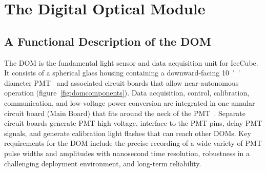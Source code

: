 
\newcommand{\degC}[1]{$\unit[#1]{^\circ{C}}$}
\def\lsim{\mathrel{\rlap{\raise 0.2ex\hbox{$\,<\,$}}{\lower 0.9ex\hbox{$\,\sim\,$}}}}
\def\gsim{\mathrel{\rlap{\raise 0.2ex\hbox{$\,>\,$}}{\lower 0.9ex\hbox{$\,\sim\,$}}}}


\section{\label{sec:dom}The Digital Optical Module}

\subsection{\label{sec:dom_functional}A Functional Description of the DOM}

The DOM is the fundamental light sensor and data acquisition unit for IceCube.
It consists of a spherical glass housing 
containing a downward-facing \SI{10}{''} diameter PMT~\cite{ICECUBE:PMT}
and associated circuit boards that allow near-autonomous operation (figure~\ref{fig:domcomponents}).
Data acquisition, control, calibration, communication, and low-voltage power conversion 
are integrated in one annular circuit board (Main Board) that fits around the neck of the PMT~\cite{ICECUBE:DAQ}. 
Separate circuit boards generate PMT high voltage, interface to the PMT pins,
delay PMT signals, and generate calibration light flashes that can reach other DOMs.
Key requirements for the DOM include
the precise recording of a wide variety of PMT pulse widths and amplitudes
with nanosecond time resolution, robustness in 
a challenging deployment environment, and long-term reliability.


